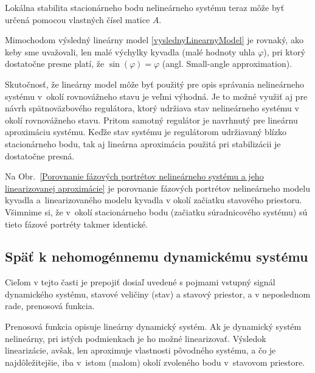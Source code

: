 \documentclass[a4paper, 10pt, ]{article}
\begin{document}
Lokálna stabilita stacionárneho bodu nelineárneho systému teraz môže byť určená pomocou vlastných čísel matice $A$.





Mimochodom výsledný lineárny model \eqref{vyslednyLinearnyModel} je rovnaký, ako keby sme uvažovali, len malé výchylky kyvadla (malé hodnoty uhla $\varphi$), pri ktorý dostatočne presne platí, že $\sin(\varphi) = \varphi$ (angl. Small-angle approximation).

Skutočnosť, že lineárny model môže byť použitý pre opis správania nelineárneho systému v~okolí rovnovážneho stavu je veľmi výhodná. Je to možné využiť aj pre návrh spätnoväzbového regulátora, ktorý udržiava stav nelineárneho systému v okolí rovnovážneho stavu. Pritom samotný regulátor je navrhnutý pre lineárnu aproximáciu systému. Keďže stav systému je regulátorom udržiavaný blízko stacionárneho bodu, tak aj lineárna aproximácia použitá pri stabilizácii je dostatočne presná.

Na Obr.~\ref{Porovnanie fázových portrétov nelineárneho systému a jeho linearizovanej aproximácie} je porovnanie fázových portrétov nelineárneho modelu kyvadla a~linearizovaného modelu kyvadla v okolí začiatku stavového priestoru. Všimnime si, že v~okolí stacionárneho bodu (začiatku súradnicového systému) sú tieto fázové portréty takmer identické.







\subsection{Späť k nehomogénnemu dynamickému systému}




Cieľom v tejto časti je prepojiť dosiaľ uvedené s pojmami vstupný signál dynamického systému, stavové veličiny (stav) a stavový priestor, a v neposlednom rade, prenosová funkcia.

Prenosová funkcia opisuje lineárny dynamický systém. Ak je dynamický systém nelineárny, pri istých podmienkach je ho možné linearizovať. Výsledok linearizácie, avšak, len aproximuje vlastnosti pôvodného systému, a čo je najdôležitejšie, iba v~istom (malom) okolí zvoleného bodu v~stavovom priestore.
\end{document}
